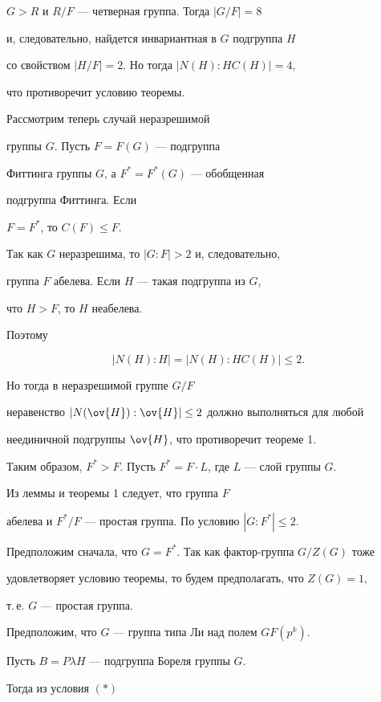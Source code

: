 $G>R$ и $R/F$ --- четверная группа. Тогда $|G/F|=8$


и, следовательно, найдется инвариантная в $G$ подгруппа $H$ 


со свойством $|H/F|=2$. Но тогда $|N(H):HC(H)|=4$,


что противоречит условию теоремы.





Рассмотрим теперь случай неразрешимой 


группы $G$. Пусть $F=F(G)$ --- подгруппа


Фиттинга группы $G$, а $F^*=F^*(G)$ --- обобщенная 


подгруппа Фиттинга. Если


$F=F^*$, то $C(F)\le F$.


Так как $G$ неразрешима, то $|G:F|>2$ и, следовательно,


группа $F$ абелева. Если $H$ --- такая подгруппа из $G$,


что $H>F$, то $H$ неабелева.


Поэтому


$$


|N(H):H|=|N(H):HC(H)|\le 2.


$$


Но тогда в неразрешимой группе $G/F$


неравенство $|N(\ov{H}):\ov{H}|\le 2$ должно выполняться для любой


неединичной подгруппы $\ov{H}$, что противоречит теореме 1.





Таким образом, $F^*>F$. Пусть $F^*=F\cdot L$, где $L$ --- слой группы $G$.


Из леммы и теоремы 1 следует, что группа $F$ 


абелева и $F^*/F$ --- простая группа. По условию $|G:F^*|\le 2$.


Предположим сначала, что $G=F^*$. Так как фактор-группа $G/Z(G)$ тоже


удовлетворяет условию теоремы, то будем предполагать, что $Z(G)=1$,


т.\,е. $G$ --- простая группа.





Предположим, что $G$ --- группа типа Ли над полем $GF(p^k)$.


Пусть $B=P\lambda H$ --- подгруппа Бореля группы $G$.


Тогда из условия $(\ast)$


